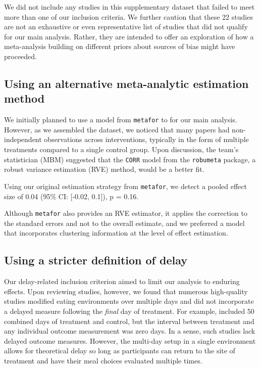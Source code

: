 \documentclass[preprint, 3p,
authoryear]{elsarticle} %
\begin{document}
We did not include any studies in this supplementary dataset that failed
to meet more than one of our inclusion criteria. We further caution that
these 22 studies are not an exhaustive or even representative list of
studies that did not qualify for our main analysis. Rather, they are
intended to offer an exploration of how a meta-analysis building on
different priors about sources of bias might have proceeded.

\subsection{Using an alternative meta-analytic estimation
method}\label{using-an-alternative-meta-analytic-estimation-method}

We initially planned to use a model from \texttt{metafor} to for our
main analysis. However, as we assembled the dataset, we noticed that
many papers had non-independent observations across interventions,
typically in the form of multiple treatments compared to a single
control group. Upon discussion, the team's statistician (MBM) suggested
that the \texttt{CORR} model from the \texttt{robumeta} package, a
robust variance estimation (RVE) method, would be a better fit.

Using our original estimation strategy from \texttt{metafor}, we detect
a pooled effect size of 0.04 (95\% CI: {[}-0.02, 0.1{]}), p = 0.16.

Although \texttt{metafor} also provides an RVE estimator, it applies the
correction to the standard errors and not to the overall estimate, and
we preferred a model that incorporates clustering information at the
level of effect estimation.

\subsection{Using a stricter definition of
delay}\label{using-a-stricter-definition-of-delay}

Our delay-related inclusion criterion aimed to limit our analysis to
enduring effects. Upon reviewing studies, however, we found that
numerous high-quality studies modified eating environments over multiple
days and did not incorporate a delayed measure following the
\emph{final} day of treatment. For example, \citep{andersson2021}
included 50 combined days of treatment and control, but the interval
between treatment and any individual outcome measurement was zero days.
In a sense, such studies lack delayed outcome measures. However, the
multi-day setup in a single environment allows for theoretical delay so
long as participants can return to the site of treatment and have their
meal choices evaluated multiple times.
\end{document}
